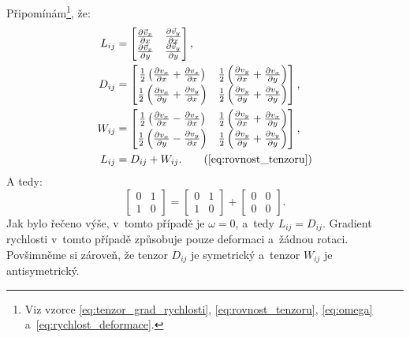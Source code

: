 \documentclass[12pt]{article}
\begin{document}
Připomínám\footnote{Viz vzorce \ref{eq:tenzor_grad_rychlosti}, \ref{eq:rovnost_tenzoru}, \ref{eq:omega} a~\ref{eq:rychlost_deformace}.}, že:
\begin{align}
    L_{ij} &= 
    \begin{bmatrix}
        \frac{\partial \vec{v}_x}{\partial x} & \frac{\partial \vec{v}_y}{\partial x} \\
        \frac{\partial \vec{v}_x}{\partial y} & \frac{\partial \vec{v}_y}{\partial y} \\
    \end{bmatrix}\text{,}\\
    D_{ij} &= 
    \begin{bmatrix}
        \frac{1}{2}\left(\frac{\partial v_x}{\partial x} + \frac{\partial v_x}{\partial x}\right) & \frac{1}{2}\left(\frac{\partial v_y}{\partial x} + \frac{\partial v_x}{\partial y}\right) \\
        \frac{1}{2}\left(\frac{\partial v_x}{\partial y} + \frac{\partial v_y}{\partial x}\right) & \frac{1}{2}\left(\frac{\partial v_y}{\partial y} + \frac{\partial v_y}{\partial y}\right) \\
    \end{bmatrix}\text{,}\\
    W_{ij} &=
    \begin{bmatrix}
        \frac{1}{2}\left(\frac{\partial v_x}{\partial x} - \frac{\partial v_x}{\partial x}\right) & \frac{1}{2}\left(\frac{\partial v_y}{\partial x} + \frac{\partial v_x}{\partial y}\right) \\
        \frac{1}{2}\left(\frac{\partial v_x}{\partial y} - \frac{\partial v_y}{\partial x}\right) & \frac{1}{2}\left(\frac{\partial v_y}{\partial y} + \frac{\partial v_y}{\partial y}\right) \\
    \end{bmatrix}\text{,}\\
    L_{ij} &= D_{ij} + W_{ij}\text{.} \tag{\ref{eq:rovnost_tenzoru}}
\end{align}
A tedy:
\begin{equation}
    \begin{bmatrix}
        0 & 1\\
        1 & 0
    \end{bmatrix} =
    \begin{bmatrix}
        0 & 1\\
        1 & 0
    \end{bmatrix} +
    \begin{bmatrix}
        0 & 0\\
        0 & 0
    \end{bmatrix}\text{.}
\end{equation}
Jak bylo řečeno výše, v~tomto případě je $\omega = 0$, a~tedy $L_{ij} = D_{ij}$. Gradient rychlosti v~tomto případě způsobuje pouze deformaci a~žádnou rotaci. Povšimněme si zároveň, že tenzor $D_{ij}$ je symetrický a~tenzor $W_{ij}$ je antisymetrický.~\cite{wiki:Strain_rate_tensor}
\end{document}
